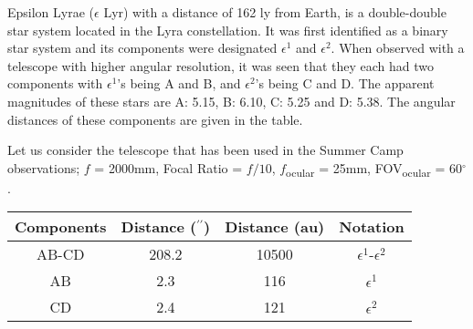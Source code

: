 \documentclass[11pt, a4paper]{exam}
\begin{document}
\begin{questions}
		
		\question
		Epsilon Lyrae ($\epsilon$ Lyr) with a distance of 162 ly from Earth, is a double-double star system located in the Lyra constellation. It was first identified as a binary star system and its components were designated $\epsilon^1$ and $\epsilon^2$. When observed with a telescope with higher angular resolution, it was seen that they each had two components with $\epsilon^1$'s being A and B, and $\epsilon^2$'s being C and D. The apparent magnitudes of these stars are A: 5.15, B: 6.10, C: 5.25 and D: 5.38. The angular distances of these components are given in the table.
		
		Let us consider the telescope that has been used in the Summer Camp observations; $f$ = 2000mm, Focal Ratio = $f/10$, $f$\textsubscript{ocular} = 25mm, FOV\textsubscript{ocular} = 60$^\circ$.
		
		\vspace{5pt}
		\begin{tabular}{c c c c}
			\hline
			Components & Distance ($^{\prime\prime}$) & Distance (au) & Notation \\
			\hline
			AB-CD & 208.2 & 10500 & $\epsilon^1$-$\epsilon^2$ \\
			AB & 2.3 & 116 & $\epsilon^1$ \\
			CD & 2.4 & 121 & $\epsilon^2$ \\ [1ex]
			\hline
		\end{tabular}
		\vspace{5pt}
		

\end{questions}
\end{document}
